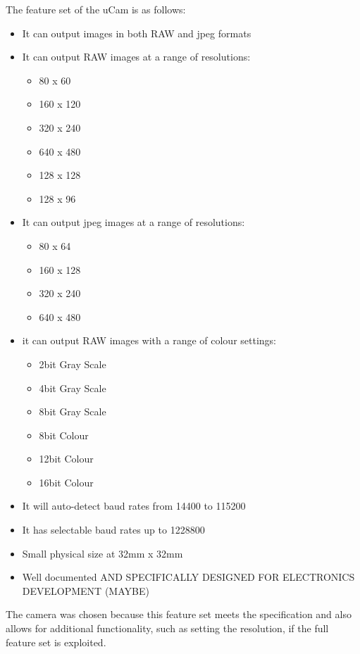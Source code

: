 The feature set of the uCam is as follows:
	\begin{itemize}
		\item It can output images in both RAW and jpeg formats
		\item It can output RAW images at a range of resolutions:
		\begin{itemize}
			\item 80 x 60
			\item 160 x 120
			\item 320 x 240
			\item 640 x 480
			\item 128 x 128
			\item 128 x 96
		\end{itemize}
		\item It can output jpeg images at a range of resolutions:
		\begin{itemize}
			\item 80 x 64
			\item 160 x 128
			\item 320 x 240
			\item 640 x 480
		\end{itemize}
		\item it can output RAW images with a range of colour settings:
		\begin{itemize}
			\item 2bit Gray Scale
			\item 4bit Gray Scale
			\item 8bit Gray Scale
			\item 8bit Colour
			\item 12bit Colour
			\item 16bit Colour
		\end{itemize}
		\item It will auto-detect baud rates from 14400 to 115200
		\item It has selectable baud rates up to 1228800
		\item Small physical size at 32mm x 32mm
		\item Well documented AND SPECIFICALLY DESIGNED FOR ELECTRONICS DEVELOPMENT (MAYBE)
	\end{itemize}

The camera was chosen because this feature set meets the specification and also allows for additional functionality, such as setting the resolution, if the full feature set is exploited.